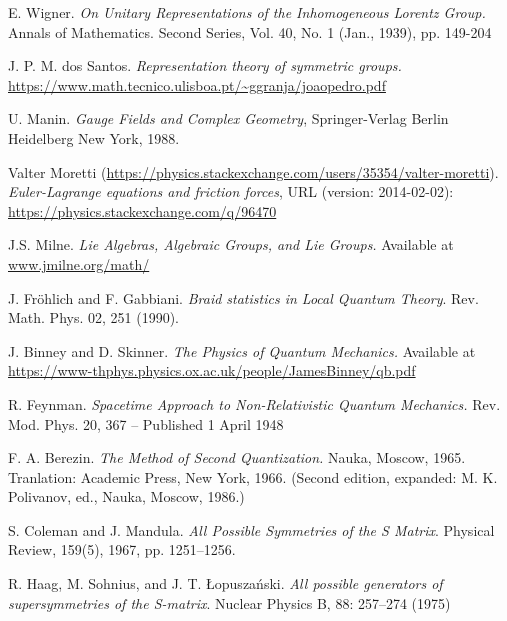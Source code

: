 \documentclass[a4paper,10pt]{scrreprt}
\theoremstyle{definition}
\theoremstyle{plain}
\theoremstyle{remark}
\begin{document}
\begin{thebibliography}{9}
   E. Wigner.
    \textit{On Unitary Representations of the Inhomogeneous Lorentz Group.}
    Annals of Mathematics. Second Series, Vol. 40, No. 1 (Jan., 1939), pp. 149-204

   J. P. M. dos Santos.
    \textit{Representation theory of symmetric groups.}
    \url{https://www.math.tecnico.ulisboa.pt/~ggranja/joaopedro.pdf}

   U. Manin.
    \textit{Gauge Fields and Complex Geometry},
    Springer-Verlag Berlin Heidelberg New York, 1988.

   Valter Moretti (\url{https://physics.stackexchange.com/users/35354/valter-moretti}).
    \textit{Euler-Lagrange equations and friction forces}, 
    URL (version: 2014-02-02): \url{https://physics.stackexchange.com/q/96470}

   J.S. Milne.
    \textit{Lie Algebras, Algebraic Groups, and Lie Groups.}
    Available at \url{www.jmilne.org/math/}

   J. Fr\"{o}hlich and F. Gabbiani. 
    \textit{Braid statistics in Local Quantum Theory}.
    Rev. Math. Phys. 02, 251 (1990). 

   J. Binney and D. Skinner.
    \textit{The Physics of Quantum Mechanics.}
    Available at \url{https://www-thphys.physics.ox.ac.uk/people/JamesBinney/qb.pdf}

   R. Feynman.
    \textit{Spacetime Approach to Non-Relativistic Quantum Mechanics.}
    Rev. Mod. Phys. 20, 367 – Published 1 April 1948

   F. A. Berezin. 
    \textit{The Method of Second Quantization.}
    Nauka, Moscow, 1965. Tranlation: Academic Press, New York, 1966. (Second edition, expanded: M. K. Polivanov, ed., Nauka, Moscow, 1986.)

   S. Coleman and J. Mandula. 
    \textit{All Possible Symmetries of the S Matrix}. 
    Physical Review, 159(5), 1967, pp. 1251–1256.

   R. Haag, M. Sohnius, and J. T. {\L}opusza\'{n}ski.
    \textit{All possible generators of supersymmetries of the S-matrix}. 
    Nuclear Physics B, 88: 257–274 (1975)
\end{thebibliography}
\end{document}
